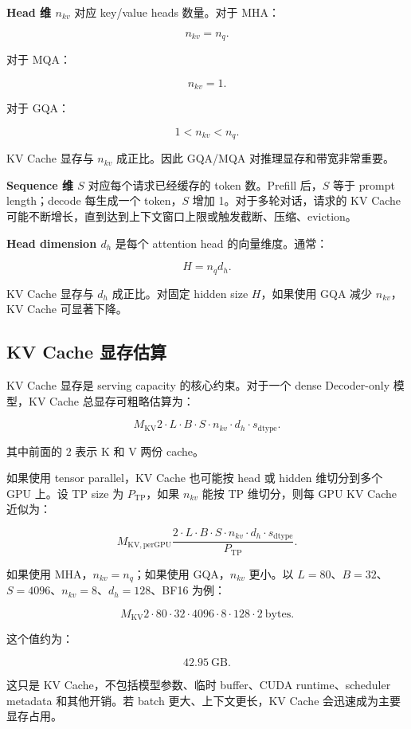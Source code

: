 \textbf{Head 维 $n_{kv}$} 对应 key/value heads 数量。对于 MHA：

\[
n_{kv}=n_q.
\]

对于 MQA：

\[
n_{kv}=1.
\]

对于 GQA：

\[
1<n_{kv}<n_q.
\]

KV Cache 显存与 $n_{kv}$ 成正比。因此 GQA/MQA 对推理显存和带宽非常重要。

\textbf{Sequence 维 $S$} 对应每个请求已经缓存的 token 数。Prefill 后，$S$ 等于 prompt length；decode 每生成一个 token，$S$ 增加 1。对于多轮对话，请求的 KV Cache 可能不断增长，直到达到上下文窗口上限或触发截断、压缩、eviction。

\textbf{Head dimension $d_h$} 是每个 attention head 的向量维度。通常：

\[
H=n_qd_h.
\]

KV Cache 显存与 $d_h$ 成正比。对固定 hidden size $H$，如果使用 GQA 减少 $n_{kv}$，KV Cache 可显著下降。

\subsection{KV Cache 显存估算}
\label{subsec:kv-cache-memory-estimation}

KV Cache 显存是 serving capacity 的核心约束。对于一个 dense Decoder-only 模型，KV Cache 总显存可粗略估算为：

\[
M_{\mathrm{KV}}
2
\cdot
L
\cdot
B
\cdot
S
\cdot
n_{kv}
\cdot
d_h
\cdot
s_{\mathrm{dtype}}.
\]

其中前面的 $2$ 表示 K 和 V 两份 cache。

如果使用 tensor parallel，KV Cache 也可能按 head 或 hidden 维切分到多个 GPU 上。设 TP size 为 $P_{\mathrm{TP}}$，如果 $n_{kv}$ 能按 TP 维切分，则每 GPU KV Cache 近似为：

\[
M_{\mathrm{KV,perGPU}}
\frac{
2
\cdot
L
\cdot
B
\cdot
S
\cdot
n_{kv}
\cdot
d_h
\cdot
s_{\mathrm{dtype}}
}
{P_{\mathrm{TP}}}.
\]

如果使用 MHA，$n_{kv}=n_q$；如果使用 GQA，$n_{kv}$ 更小。以 $L=80$、$B=32$、$S=4096$、$n_{kv}=8$、$d_h=128$、BF16 为例：

\[
M_{\mathrm{KV}}
2
\cdot
80
\cdot
32
\cdot
4096
\cdot
8
\cdot
128
\cdot
2
\ \mathrm{bytes}.
\]

这个值约为：

\[
42.95\ \mathrm{GB}.
\]

这只是 KV Cache，不包括模型参数、临时 buffer、CUDA runtime、scheduler metadata 和其他开销。若 batch 更大、上下文更长，KV Cache 会迅速成为主要显存占用。

